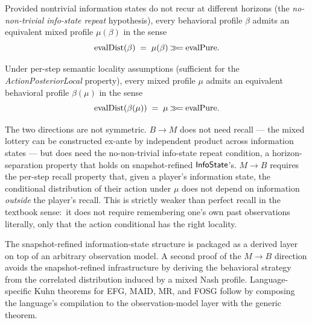 \begin{theorem}
\label{thm:kuhn-bm}
Provided nontrivial information states do not recur at different
horizons (the \emph{no-non-trivial info-state repeat} hypothesis),
every behavioral profile $\beta$ admits an equivalent mixed profile
$\mu(\beta)$ in the sense
\[
  \mathrm{evalDist}(\beta) \;=\; \mu(\beta) \mathbin{\mathbin{\gg\!=}} \mathrm{evalPure}.
\]
\end{theorem}

\begin{theorem}
\label{thm:kuhn-mb}
Under per-step semantic locality assumptions (sufficient for the
\emph{ActionPosteriorLocal} property), every mixed profile $\mu$
admits an equivalent behavioral profile $\beta(\mu)$ in the sense
\[
  \mathrm{evalDist}(\beta(\mu)) \;=\; \mu \mathbin{\mathbin{\gg\!=}} \mathrm{evalPure}.
\]
\end{theorem}

\noindent The two directions are not symmetric.  $B \to M$ does
not need recall — the mixed lottery can be constructed
ex-ante by independent product across information states — but
does need the no-non-trivial info-state repeat condition, a
horizon-separation property that holds on snapshot-refined
$\mathsf{InfoState}$'s.  $M \to B$ requires the per-step recall property
that, given a player's information state, the conditional
distribution of their action under $\mu$ does not depend on
information \emph{outside} the player's recall.  This is
strictly weaker than perfect recall in the textbook sense:\ it
does not require remembering one's own past observations
literally, only that the action conditional has the right
locality.

The snapshot-refined information-state structure is packaged as a
derived layer on top of an arbitrary observation model.  A second
proof of the $M \to B$ direction avoids the snapshot-refined
infrastructure by deriving the behavioral strategy from the correlated
distribution induced by a mixed Nash profile.  Language-specific Kuhn
theorems for EFG, MAID, MR, and FOSG follow by composing the language's
compilation to the observation-model layer with the generic theorem.


